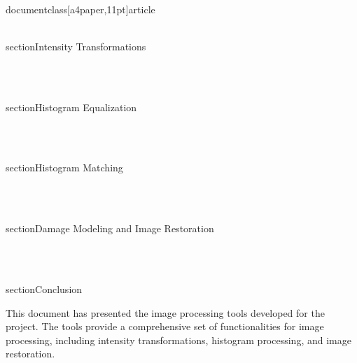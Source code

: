 \\documentclass[a4paper,11pt]{article}
\begin{document}
\\section{Intensity Transformations}

\

\\section{Histogram Equalization}

\

\\section{Histogram Matching}

\

\\section{Damage Modeling and Image Restoration}

\

\\section{Conclusion}

This document has presented the image processing tools developed for the project. The tools provide a comprehensive set of functionalities for image processing, including intensity transformations, histogram processing, and image restoration.

\
\end{document}
